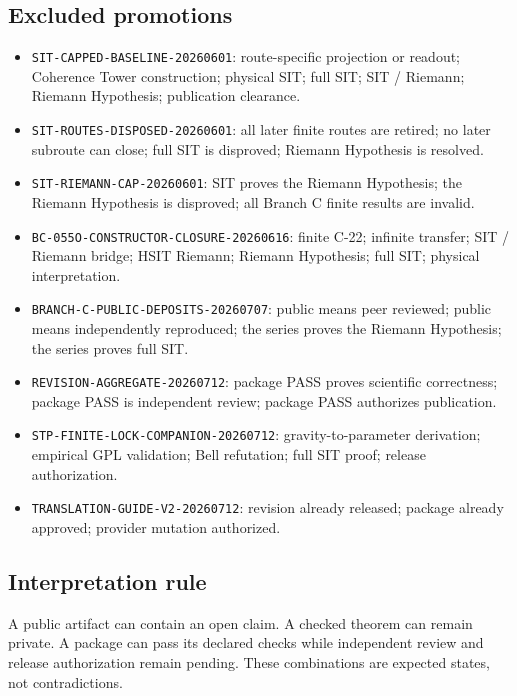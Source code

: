 \documentclass[
  american,
  11pt,
  letterpaper,
]{article}
\providecommand{\tightlist}{%
  \setlength{\itemsep}{0pt}\setlength{\parskip}{0pt}}
\begin{document}
\subsection{Excluded promotions}\label{excluded-promotions}

\begin{itemize}
\tightlist
\item
  \nolinkurl{SIT-CAPPED-BASELINE-20260601}: route-specific projection or readout; Coherence Tower construction; physical SIT; full SIT; SIT / Riemann; Riemann Hypothesis; publication clearance.
\item
  \nolinkurl{SIT-ROUTES-DISPOSED-20260601}: all later finite routes are retired; no later subroute can close; full SIT is disproved; Riemann Hypothesis is resolved.
\item
  \nolinkurl{SIT-RIEMANN-CAP-20260601}: SIT proves the Riemann Hypothesis; the Riemann Hypothesis is disproved; all Branch C finite results are invalid.
\item
  \nolinkurl{BC-055O-CONSTRUCTOR-CLOSURE-20260616}: finite C-22; infinite transfer; SIT / Riemann bridge; HSIT Riemann; Riemann Hypothesis; full SIT; physical interpretation.
\item
  \nolinkurl{BRANCH-C-PUBLIC-DEPOSITS-20260707}: public means peer reviewed; public means independently reproduced; the series proves the Riemann Hypothesis; the series proves full SIT.
\item
  \nolinkurl{REVISION-AGGREGATE-20260712}: package PASS proves scientific correctness; package PASS is independent review; package PASS authorizes publication.
\item
  \nolinkurl{STP-FINITE-LOCK-COMPANION-20260712}: gravity-to-parameter derivation; empirical GPL validation; Bell refutation; full SIT proof; release authorization.
\item
  \nolinkurl{TRANSLATION-GUIDE-V2-20260712}: revision already released; package already approved; provider mutation authorized.
\end{itemize}

\subsection{Interpretation rule}\label{interpretation-rule}

A public artifact can contain an open claim. A checked theorem can remain private. A package can pass its declared checks while independent review and release authorization remain pending. These combinations are expected states, not contradictions.
\end{document}
